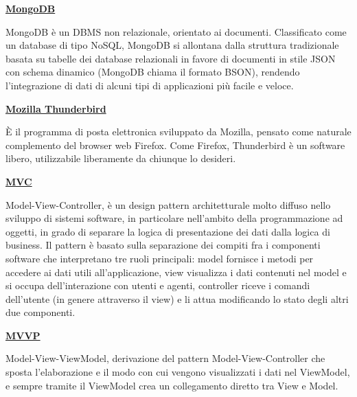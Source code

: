 \begin{addmargin}[0em]{0em}	
	\textbf{\underline{MongoDB}} 
\end{addmargin}
	
\medskip
\begin{addmargin}[5em]{1em}	
MongoDB è un DBMS non relazionale, orientato ai documenti. Classificato come un database di tipo NoSQL, MongoDB si allontana dalla struttura tradizionale basata su tabelle dei database relazionali in favore di documenti in stile JSON con schema dinamico (MongoDB chiama il formato BSON), rendendo l'integrazione di dati di alcuni tipi di applicazioni più facile e veloce. 
\end{addmargin}	

\bigskip
\begin{addmargin}[0em]{0em}	
	\textbf{\underline{Mozilla Thunderbird}} 
\end{addmargin}

\medskip
\begin{addmargin}[5em]{1em}	
È il programma di posta elettronica sviluppato da Mozilla, pensato come naturale complemento del browser web Firefox. 
Come Firefox, Thunderbird è un software libero, utilizzabile liberamente da chiunque lo desideri.
\end{addmargin}	

\bigskip
\begin{addmargin}[0em]{0em}	
	\textbf{\underline{MVC}} 
\end{addmargin}

\medskip
\begin{addmargin}[5em]{1em}	
Model-View-Controller, è un design pattern architetturale molto diffuso nello sviluppo di sistemi software, in particolare nell'ambito della programmazione ad oggetti, in grado di separare la logica di presentazione dei dati dalla logica di business. Il pattern è basato sulla separazione dei compiti fra i componenti software che interpretano tre ruoli principali: model fornisce i metodi per accedere ai dati utili all'applicazione, view visualizza i dati contenuti nel model e si occupa dell'interazione con utenti e agenti, controller riceve i comandi dell'utente (in genere attraverso il view) e li attua modificando lo stato degli altri due componenti.
\end{addmargin}	

\bigskip
\begin{addmargin}[0em]{0em}	
	\textbf{\underline{MVVP}} 
\end{addmargin}

\medskip
\begin{addmargin}[5em]{1em}
Model-View-ViewModel, derivazione del pattern Model-View-Controller che sposta l'elaborazione e il modo con cui vengono visualizzati i dati nel ViewModel, e sempre tramite il ViewModel crea un collegamento diretto tra View e Model.
\end{addmargin}	

